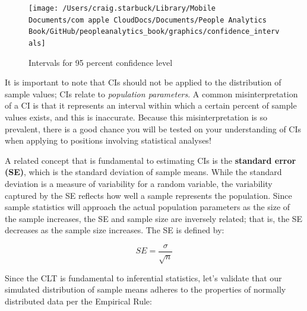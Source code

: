 \documentclass[
]{book}
\newenvironment{Shaded}{\begin{snugshade}}{\end{snugshade}}
\newcommand{\CommentTok}[1]{\textcolor[rgb]{0.56,0.35,0.01}{\textit{#1}}}
\newcommand{\DecValTok}[1]{\textcolor[rgb]{0.00,0.00,0.81}{#1}}
\newcommand{\FunctionTok}[1]{\textcolor[rgb]{0.00,0.00,0.00}{#1}}
\newcommand{\NormalTok}[1]{#1}
\newcommand{\OtherTok}[1]{\textcolor[rgb]{0.56,0.35,0.01}{#1}}
\newcommand{\SpecialCharTok}[1]{\textcolor[rgb]{0.00,0.00,0.00}{#1}}
\newcommand{\StringTok}[1]{\textcolor[rgb]{0.31,0.60,0.02}{#1}}
\begin{document}
\begin{figure}

{\centering \texttt{[image: /Users/craig.starbuck/Library/Mobile Documents/com~apple~CloudDocs/Documents/People Analytics Book/GitHub/peopleanalytics\_book/graphics/confidence\_intervals]} 

}

\caption{Intervals for 95 percent confidence level}\label{fig:conf-int}
\end{figure}

It is important to note that CIs should not be applied to the distribution of sample values; CIs relate to \emph{population parameters}. A common misinterpretation of a CI is that it represents an interval within which a certain percent of sample values exists, and this is inaccurate. Because this misinterpretation is so prevalent, there is a good chance you will be tested on your understanding of CIs when applying to positions involving statistical analyses!

A related concept that is fundamental to estimating CIs is the \textbf{standard error (SE)}, which is the standard deviation of sample means. While the standard deviation is a measure of variability for a random variable, the variability captured by the SE reflects how well a sample represents the population. Since sample statistics will approach the actual population parameters as the size of the sample increases, the SE and sample size are inversely related; that is, the SE decreases as the sample size increases. The SE is defined by:

\[ SE = \frac{\sigma}{\sqrt{n}} \]

Since the CLT is fundamental to inferential statistics, let's validate that our simulated distribution of sample means adheres to the properties of normally distributed data per the Empirical Rule:

\begin{Shaded}
\end{Shaded}
\end{document}

